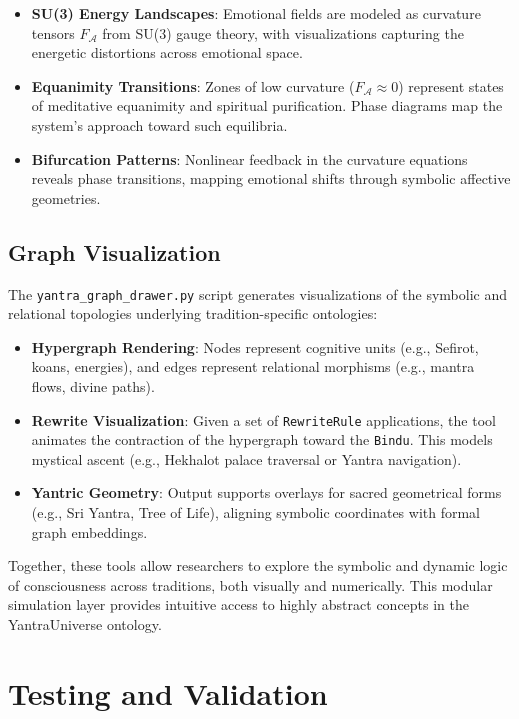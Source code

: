 \documentclass[12pt]{article}
\theoremstyle{plain}
\begin{document}
\begin{itemize}
  \item \textbf{SU(3) Energy Landscapes}: Emotional fields are modeled as curvature tensors $F_{\mathcal{A}}$ from SU(3) gauge theory, with visualizations capturing the energetic distortions across emotional space.
  \item \textbf{Equanimity Transitions}: Zones of low curvature ($F_{\mathcal{A}} \approx 0$) represent states of meditative equanimity and spiritual purification. Phase diagrams map the system's approach toward such equilibria.
  \item \textbf{Bifurcation Patterns}: Nonlinear feedback in the curvature equations reveals phase transitions, mapping emotional shifts through symbolic affective geometries.
\end{itemize}

\subsection{Graph Visualization}

The \texttt{yantra\_graph\_drawer.py} script generates visualizations of the symbolic and relational topologies underlying tradition-specific ontologies:

\begin{itemize}
  \item \textbf{Hypergraph Rendering}: Nodes represent cognitive units (e.g., Sefirot, koans, energies), and edges represent relational morphisms (e.g., mantra flows, divine paths).
  \item \textbf{Rewrite Visualization}: Given a set of \texttt{RewriteRule} applications, the tool animates the contraction of the hypergraph toward the \texttt{Bindu}. This models mystical ascent (e.g., Hekhalot palace traversal or Yantra navigation).
  \item \textbf{Yantric Geometry}: Output supports overlays for sacred geometrical forms (e.g., Sri Yantra, Tree of Life), aligning symbolic coordinates with formal graph embeddings.
\end{itemize}

Together, these tools allow researchers to explore the symbolic and dynamic logic of consciousness across traditions, both visually and numerically. This modular simulation layer provides intuitive access to highly abstract concepts in the YantraUniverse ontology.

\section{Testing and Validation}
\end{document}
